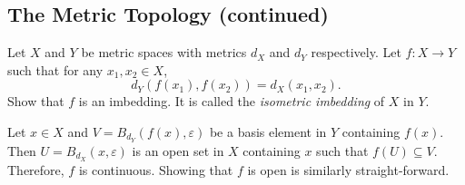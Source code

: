 \subsection{The Metric Topology (continued)}

	\setcounter{exercise}{1}
	\begin{exercise}
		Let $X$ and $Y$ be metric spaces with metrics $d_X$ and $d_Y$ respectively. Let $f:X\to Y$ such that for any $x_1,x_2\in X$,
		\[ d_Y(f(x_1), f(x_2)) = d_X(x_1,x_2). \]
		Show that $f$ is an imbedding. It is called the \textit{isometric imbedding} of $X$ in $Y$.
	\end{exercise}
	\begin{solution*}
		Let $x\in X$ and $V = B_{d_Y}(f(x),\varepsilon)$ be a basis element in $Y$ containing $f(x)$. Then $U = B_{d_X}(x,\varepsilon)$ is an open set in $X$ containing $x$ such that $f(U)\subseteq V$. Therefore, $f$ is continuous. Showing that $f$ is open is similarly straight-forward.
	\end{solution*}

